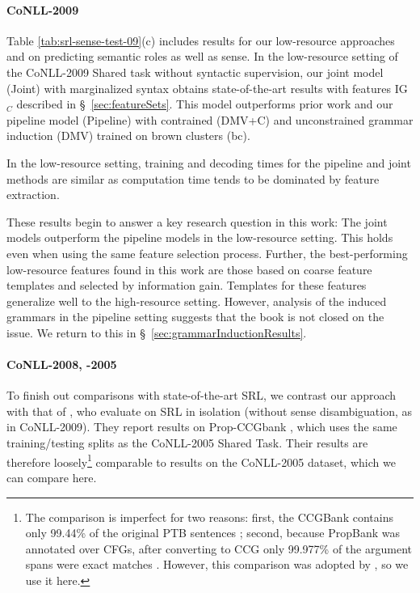 \documentclass[11pt]{article}
\newcommand{\coarseIgFeats}{\textrm{IG$_{C}$}}
\begin{document}
\paragraph{CoNLL-2009}
Table \ref{tab:srl-sense-test-09}(c) includes results for our
low-resource approaches and  on
predicting semantic roles as well as sense.  In the low-resource
setting of the CoNLL-2009 Shared task without syntactic supervision,
 our joint model (Joint) with marginalized syntax
  obtains state-of-the-art results with features \coarseIgFeats{} described in 
  \S~\ref{sec:featureSets}. 
  This model outperforms prior work \cite{naradowsky_improving_2012} and 
  our pipeline model (Pipeline) with contrained (DMV+C) and 
  unconstrained grammar induction (DMV) trained on brown clusters (bc). 

 In the low-resource setting, training and decoding times for the
pipeline and joint methods are similar as computation time tends to be
dominated by feature extraction.

These results begin to answer a key research question in this work: 
The joint models outperform the pipeline models in the low-resource setting. 
This holds even when using the same feature selection process. 
Further, the best-performing low-resource features found in this work are 
those based on coarse feature templates and selected by information gain. 
Templates for these features generalize well to the high-resource 
setting.  However, analysis of the induced grammars in the pipeline setting 
suggests that the book is not closed on the issue.  We return to this 
in \S~\ref{sec:grammarInductionResults}.

\paragraph{CoNLL-2008, -2005}
To finish out comparisons with state-of-the-art SRL, we 
contrast our approach with that of , who evaluate on SRL 
in isolation (without sense disambiguation, as in CoNLL-2009).
They report results on Prop-CCGbank \cite{boxwell_projecting_2008},
which uses the same training/testing splits as the 
CoNLL-2005 Shared Task.
 Their results are therefore 
loosely\footnote{The comparison is imperfect for two reasons:
first, the CCGBank contains only 99.44\% of the original PTB sentences
\cite{hockenmaier_ccgbank:_2007}; second, because PropBank was
annotated over CFGs, after converting to CCG only 99.977\% of the
argument spans were exact matches
\cite{boxwell_projecting_2008}. However, this comparison was adopted
by , so we use it here.} comparable to
results on the CoNLL-2005 dataset, which we can compare here.
\end{document}
